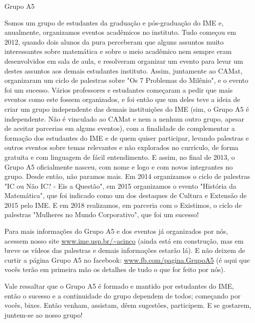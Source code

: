 \begin{subsecao}{Grupo A5}


Somos um grupo de estudantes da graduação e pós-graduação do IME e, anualmente,
organizamos eventos acadêmicos no instituto. Tudo começou em 2012, quando dois
alunos da pura perceberam que alguns assuntos muito interessantes sobre
matemática e sobre o meio acadêmico nem sempre eram desenvolvidos em sala de
aula, e resolveram organizar um evento para levar um destes assuntos aos demais
estudantes instituto. Assim, juntamente ao CAMat, organizaram um ciclo de
palestras sobre "Os 7 Problemas do Milênio", e o evento foi um sucesso.  Vários
professores e estudantes começaram a pedir que mais eventos como este fossem
organizados, e foi então que um deles teve a ideia de criar um grupo
independente das demais instituições do IME (sim, o Grupo A5 é independente. Não
é vinculado ao CAMat e nem a nenhum outro grupo, apesar de aceitar parcerias em
alguns eventos), com a finalidade de complementar a formação dos estudantes do
IME e de quem quiser participar, levando palestras e outros eventos sobre temas
relevantes e não explorados no currículo, de forma gratuita e com linguagem de
fácil entendimento.  E assim, no final de 2013, o Grupo A5 oficialmente nasceu,
com nome e logo e com novos integrantes no grupo.  Desde então, não paramos
mais. Em 2014 organizamos o ciclo de palestras "IC ou Não IC? - Eis a Questão",
em 2015 organizamos o evento "História da Matemática", que foi indicado como um
dos destaques de Cultura e Extensão de 2015 pelo IME. E em 2018 realizamos, em 
parceria com o Existimos, o ciclo de palestras "Mulheres no Mundo Corporativo",
que foi um sucesso! 

Para mais informações do Grupo A5 e dos eventos já organizados por nós, acessem
nosso site \url{www.ime.usp.br/~acinco} (ainda está em construção, mas em breve os
vídeos das palestras e demais informações estarão lá). E não deixem de curtir
a página Grupo A5 no facebook: \url{www.fb.com/pagina.GrupoA5} (é aqui que
vocês terão em primeira mão os detalhes de tudo o que for feito por nós).

Vale ressaltar que o Grupo A5 é formado e mantido por estudantes do IME, então o
sucesso e a continuidade do grupo dependem de todos; começando por vocês,
bixes. Então venham, assistam, dêem sugestões, participem. E se gostarem,
juntem-se ao nosso grupo!

\end{subsecao}
